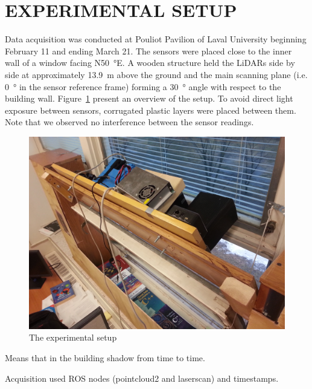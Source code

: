 \section{EXPERIMENTAL SETUP}
Data acquisition was conducted at Pouliot Pavilion of Laval University beginning February 11 and ending March 21. The sensors were placed close to the inner wall of a window facing N\SI{50}{\degree}E. A wooden structure held the LiDARs side by side at approximately \SI{13.9}{\meter} above the ground and the main scanning plane (i.e. \SI{0}{\degree} in the sensor reference frame) forming a \SI{30}{\degree} angle with respect to the building wall. Figure~\ref{fig:setup} present an overview of the setup. To avoid direct light exposure between sensors, corrugated plastic layers were placed between them. Note that we observed no interference between the sensor readings.

\begin{figure}[h]
    \centering
    \includegraphics[width=0.95\linewidth]{./img/setup_diag.jpg}
    \caption{The experimental setup}
    \label{fig:setup}
\end{figure}

Means that in the building shadow from time to time.

Acquisition used ROS nodes (pointcloud2 and laserscan) and timestamps.

